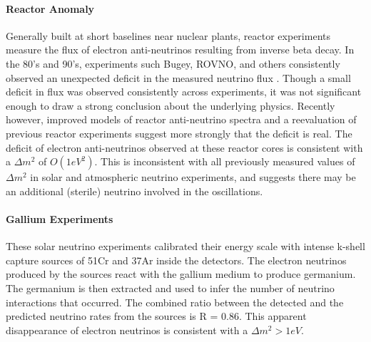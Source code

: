 \paragraph{Reactor Anomaly}
Generally built at short baselines near nuclear plants, reactor experiments measure the flux of electron anti-neutrinos resulting from inverse beta decay. In the 80's and 90's, experiments such Bugey, ROVNO, and others consistently observed an unexpected deficit in the measured neutrino flux \cite{bib:bugey} \cite{bib:rovno}. Though a small deficit in flux was observed consistently across experiments, it was not significant enough to draw a strong conclusion about the underlying physics.  Recently however, improved models of reactor anti-neutrino spectra \cite{bib:improvedReactor} and a reevaluation of previous reactor experiments \cite{bib:reactorGeneral} suggest more strongly that the deficit is real. The deficit of electron anti-neutrinos observed at these reactor cores is consistent with a  $\Delta m^2$ of $O(1 eV^2)$. This is inconsistent with all previously measured values of $\Delta m^2$ in solar and atmospheric neutrino experiments, and suggests there may be an additional (sterile) neutrino involved in the oscillations. 

\paragraph{Gallium Experiments}
These solar neutrino experiments calibrated their energy scale with intense k-shell capture sources of 51Cr and 37Ar inside the detectors. The electron neutrinos produced by the sources react with the gallium medium to produce germanium.  The germanium is then extracted and used to infer the number of neutrino interactions that occurred.  The combined ratio between the detected and the predicted neutrino rates from the sources is R = 0.86. This apparent disappearance of electron neutrinos is consistent with a $\Delta m^2 \gt 1 eV$.


